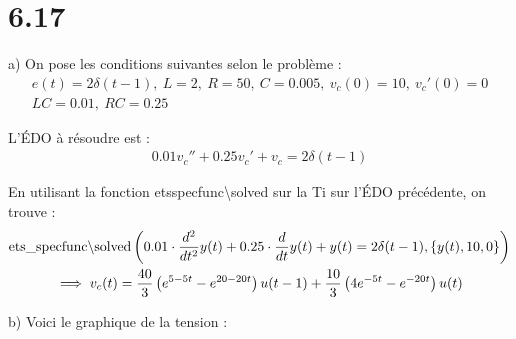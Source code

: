 \section*{6.17}

a) On pose les conditions suivantes selon le problème :
\begin{gather*}
    e(t) = 2\delta(t-1),\ L = 2,\ R = 50,\ C = 0.005,\ v_c(0)=10,\ v_c'(0)=0 \\
    LC = 0.01,\ RC = 0.25
\end{gather*}

L'ÉDO à résoudre est :
\begin{align*}
    0.01v_c'' + 0.25v_c' + v_c = 2\delta(t-1)
\end{align*}

En utilisant la fonction ets\textunderscore specfunc\textbackslash solved sur la Ti
sur l'ÉDO précédente, on trouve :
\begin{gather*}
    \operatorname{ets\_ specfunc\backslash solved} \left({0.01\cdot\dfrac{d ^2}{d t^2}y(t) + 0.25\cdot\dfrac{d }{d t}y(t) + y(t)
    = 2\delta(t-1),\{y(t),10,0\}}\right) \\
    \implies v_c(t) = \dfrac{40}{3}\left({e^{5-5t}-e^{20-20t}}\right)u(t-1)
    +\dfrac{10}{3}\left({4 e^{-5t}-e^{-20t}}\right)u(t)
\end{gather*}

b) Voici le graphique de la tension :
\begin{center}
\end{center}
